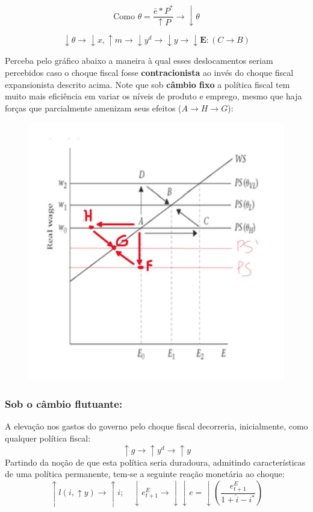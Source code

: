 \documentclass[a4paper,12pt]{article}[abntex2]
\begin{document}
\[
\text{Como } \theta = \frac{\bar{e} \ast P^*}{\uparrow P} \rightarrow \downarrow \theta
\]

\[
\downarrow \theta \rightarrow \downarrow x, \uparrow m \rightarrow \downarrow y^d \rightarrow \downarrow y \rightarrow \downarrow \mathbf{E}\!:\!(C \rightarrow B)
\]

Perceba pelo gráfico abaixo a maneira à qual esses deslocamentos seriam percebidos caso o choque fiscal fosse \textbf{contracionista} ao invés do choque fiscal expansionista descrito acima. Note que sob \textbf{câmbio fixo} a política fiscal tem muito mais eficiência em variar os níveis de produto e emprego, mesmo que haja forças que parcialmente amenizam seus efeitos (\(A \rightarrow H \rightarrow G\)): 
\begin{figure}[H]
    \centering
    \includegraphics[width=0.7\linewidth]{Imagens/a25i2.png}
\end{figure}

\subsubsection{\textbf{Sob o câmbio flutuante:}}
A elevação nos gastos do governo pelo choque fiscal decorreria, inicialmente, como qualquer política fiscal:  
\[
\uparrow g \rightarrow \uparrow y^d \rightarrow \uparrow y
\]  
Partindo da noção de que esta política seria duradoura, admitindo características de uma política permanente, tem-se a seguinte reação monetária ao choque:  
\[
\uparrow l(i, \uparrow y) \rightarrow \uparrow i; \quad \downarrow e_{t+1}^E \rightarrow \downarrow \downarrow e = 
\downarrow \left( \frac{e_{t+1}^E}{1 + \hat{i} - i^*} \right)
\]
\end{document}
